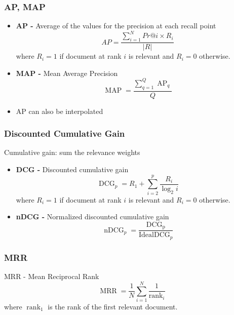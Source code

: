 \documentclass[svgnames]{beamer}
\begin{document}
\begin{frame}
  \frametitle{AP, MAP}
  
  \begin{block}{}
    \begin{itemize}
    \item \textbf{AP -} Average of the values for the precision at each recall
        point
        \begin{displaymath}
            AP = \frac{\sum_{i=1}^N Pr@i \times R_i}{|R|}
        \end{displaymath}
        where $R_i = 1$ if document at rank $i$ is relevant and $R_i = 0$
        otherwise.
    \item \textbf{MAP -} Mean Average Precision
        \begin{displaymath}
            \operatorname{MAP} = \frac{\sum_{q=1}^Q\operatorname{AP}_q}{Q}
        \end{displaymath}
    \item AP can also be interpolated
    \end{itemize}
  \end{block}
\end{frame}

\begin{frame}
  \frametitle{Discounted Cumulative Gain}
  
  \begin{block}{Cumulative gain: sum the relevance weights}
    \begin{itemize}
    \item \textbf{DCG -} Discounted cumulative gain
        \begin{displaymath}
            \operatorname{DCG}_p = R_1 + \sum_{i=2}^p\frac{R_i}{\log_2i}
        \end{displaymath}
        where $R_i = 1$ if document at rank $i$ is relevant and $R_i = 0$
        otherwise.
    \item \textbf{nDCG -} Normalized discounted cumulative gain
        \begin{displaymath}
            \operatorname{nDCG}_p = \frac{\operatorname{DCG_p}}{\text{Ideal}\operatorname{DCG}_p}
        \end{displaymath}
    \end{itemize}
  \end{block}
\end{frame}

\begin{frame}
  \frametitle{MRR}
  
  \begin{block}{MRR - Mean Reciprocal Rank}
        \begin{displaymath}
            \operatorname{MRR} = \frac{1}{N}\sum_{i=1}^N\frac{1}{\operatorname{rank}_i}
        \end{displaymath}
        where $\operatorname{rank}_1$ is the rank of the first relevant
        document.
  \end{block}
\end{frame}
\end{document}
